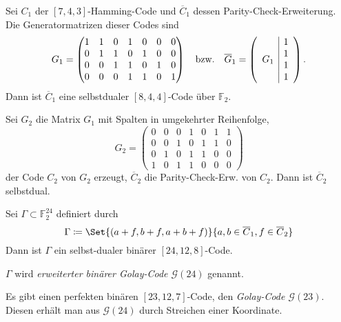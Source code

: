 \documentclass{cheat-sheet}
\newcommand{\F}{\mathbb{F}} %
\newcommand{\Golay}{\mathcal{G}} %
\begin{document}
\begin{konstr}
  Sei $C_1$ der $[7, 4, 3]$-Hamming-Code und $\overline{C}_1$ dessen Parity-Check-Erweiterung.
  Die Generatormatrizen dieser Codes sind
  \[
    G_1 = \begin{pmatrix}
      1 & 1 & 0 & 1 & 0 & 0 & 0 \\
      0 & 1 & 1 & 0 & 1 & 0 & 0 \\
      0 & 0 & 1 & 1 & 0 & 1 & 0 \\
      0 & 0 & 0 & 1 & 1 & 0 & 1
    \end{pmatrix}
    \quad \text{bzw.} \quad
    \overline{G}_1 = \left( \begin{array}{c | c}
      \multirow{4}{*}{$G_1$} & 1 \\
      & 1 \\
      & 1 \\
      & 1
    \end{array} \right).
  \]
  Dann ist $\overline{C}_1$ eine selbstdualer $[8,4,4]$-Code über $\F_2$.
  
  Sei $G_2$ die Matrix $G_1$ mit Spalten in umgekehrter Reihenfolge,
  \[
    G_2 = \begin{pmatrix}
      0 & 0 & 0 & 1 & 0 & 1 & 1 \\
      0 & 0 & 1 & 0 & 1 & 1 & 0 \\
      0 & 1 & 0 & 1 & 1 & 0 & 0 \\
      1 & 0 & 1 & 1 & 0 & 0 & 0
    \end{pmatrix}
  \]
  der Code $C_2$ von $G_2$ erzeugt, $\overline{C}_2$ die Parity-Check-Erw. von $C_2$.
  Dann ist $\overline{C}_2$ selbstdual.
\end{konstr}

\begin{satz}
  Sei $\Gamma \subset \F_2^{24}$ definiert durch
  \[ \Gamma \coloneqq \Set{(a+f, b+f, a+b+f)}{a, b \in \overline{C}_1, f \in \overline{C}_2} \]
  Dann ist $\Gamma$ ein selbst-dualer binärer $[24, 12, 8]$-Code.
\end{satz}

\begin{defn}
  $\Gamma$ wird \emph{erweiterter binärer Golay-Code $\Golay(24)$} genannt.
\end{defn}


\begin{satz}
  Es gibt einen perfekten binären $[23, 12, 7]$-Code, den \emph{Golay-Code $\Golay(23)$}.
  Diesen erhält man aus $\Golay(24)$ durch Streichen einer Koordinate.
\end{satz}
\end{document}
